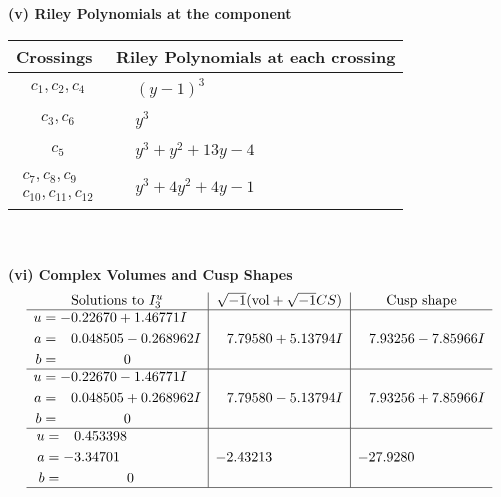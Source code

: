 \documentclass[1p]{elsarticle_modified}
\theoremstyle{definition}
\newcommand{\I}{\sqrt{-1}}
\begin{document}
\newpage\renewcommand{\arraystretch}{1}
\flushleft \textbf{(v) Riley Polynomials at the component}\newline \\
\begin{tabular}{m{50pt}|m{274pt}}
Crossings & \hspace{64pt}Riley Polynomials at each crossing \\
\hline $$\begin{aligned}c_{1},c_{2},c_{4}\end{aligned}$$&$\begin{aligned}
&(y-1)^3
\end{aligned}$\\
\hline $$\begin{aligned}c_{3},c_{6}\end{aligned}$$&$\begin{aligned}
&y^3
\end{aligned}$\\
\hline $$\begin{aligned}c_{5}\end{aligned}$$&$\begin{aligned}
&y^3+y^2+13 y-4
\end{aligned}$\\
\hline $$\begin{aligned}c_{7},c_{8},c_{9}\\c_{10},c_{11},c_{12}\end{aligned}$$&$\begin{aligned}
&y^3+4 y^2+4 y-1
\end{aligned}$\\
\hline
\end{tabular}\\~\\
\newpage\flushleft \textbf{(vi) Complex Volumes and Cusp Shapes}
$$\begin{array}{c|c|c}  
\text{Solutions to }I^u_{3}& \I (\text{vol} + \sqrt{-1}CS) & \text{Cusp shape}\\
 \hline 
\begin{aligned}
u &= -0.22670 + 1.46771 I \\
a &= \phantom{-}0.048505 - 0.268962 I \\
b &= \phantom{-0.000000 } 0\end{aligned}
 & \phantom{-}7.79580 + 5.13794 I & \phantom{-}7.93256 - 7.85966 I \\ \hline\begin{aligned}
u &= -0.22670 - 1.46771 I \\
a &= \phantom{-}0.048505 + 0.268962 I \\
b &= \phantom{-0.000000 } 0\end{aligned}
 & \phantom{-}7.79580 - 5.13794 I & \phantom{-}7.93256 + 7.85966 I \\ \hline\begin{aligned}
u &= \phantom{-}0.453398\phantom{ +0.000000I} \\
a &= -3.34701\phantom{ +0.000000I} \\
b &= \phantom{-0.000000 } 0\end{aligned}
 & -2.43213\phantom{ +0.000000I} & -27.9280\phantom{ +0.000000I}\\
 \hline 
 \end{array}$$\newpage\newpage\renewcommand{\arraystretch}{1}
\end{document}
